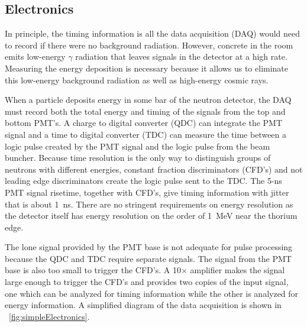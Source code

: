 \subsection{Electronics}
\label{sec:electronics}

In principle, the timing information is all the data acquisition (DAQ) would need to record if there were no background radiation.  However, concrete in the room emits low-energy $\gamma$ radiation that leaves signals in the detector at a high rate.  Measuring the energy deposition is necessary because it allows us to eliminate this low-energy background radiation as well as high-energy cosmic rays.

When a particle deposits energy in some bar of the neutron detector, the DAQ must record both the total energy and timing of the signals from the top and bottom PMT's.  A charge to digital converter (QDC) can integrate the PMT signal and a time to digital converter (TDC) can measure the time between a logic pulse created by the PMT signal and the logic pulse from the beam buncher.  Because time resolution is the only way to distinguish groups of neutrons with different energies, constant fraction discriminators (CFD's) and not leading edge discriminators create the logic pulse sent to the TDC.  The 5-ns PMT signal risetime, together with CFD's, give timing information with jitter that is about 1~ns.  There are no stringent requirements on energy resolution as the detector itself has energy resolution on the order of 1~MeV near the thorium edge.

The lone signal provided by the PMT base is not adequate for pulse processing because the QDC and TDC require separate signals.  The signal from the PMT base is also too small to trigger the CFD's.  A 10$\times$ amplifier makes the signal large enough to trigger the CFD's and provides two copies of the input signal, one which can be analyzed for timing information while the other is analyzed for energy information.  A simplified diagram of the data acquisition is shown in {\fig}~\ref{fig:simpleElectronics}.

